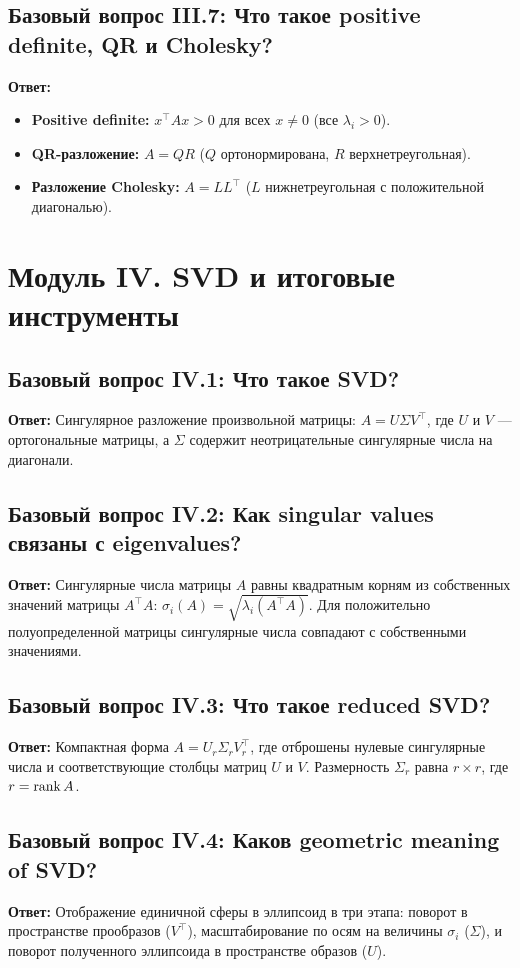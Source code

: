\subsection{Базовый вопрос III.7: Что такое positive definite, QR и Cholesky?}
\textbf{Ответ:}
\begin{itemize}
    \item \textbf{Positive definite:} $x^\top A x > 0$ для всех $x \ne 0$ (все $\lambda_i > 0$).
    \item \textbf{QR-разложение:} $A = QR$ ($Q$ ортонормирована, $R$ верхнетреугольная).
    \item \textbf{Разложение Cholesky:} $A = L L^\top$ ($L$ нижнетреугольная с положительной диагональю).
\end{itemize}

\newpage

\section{Модуль IV. SVD и итоговые инструменты}

\subsection{Базовый вопрос IV.1: Что такое SVD?}
\textbf{Ответ:} Сингулярное разложение произвольной матрицы: $A = U \Sigma V^\top$, где $U$ и $V$ — ортогональные
матрицы, а $\Sigma$ содержит неотрицательные сингулярные числа на диагонали.

\subsection{Базовый вопрос IV.2: Как singular values связаны с eigenvalues?}
\textbf{Ответ:} Сингулярные числа матрицы $A$ равны квадратным корням из собственных значений матрицы $A^\top A$:
$\sigma_i(A) = \sqrt{\lambda_i(A^\top A)}$.
Для положительно полуопределенной матрицы сингулярные числа совпадают с собственными значениями.

\subsection{Базовый вопрос IV.3: Что такое reduced SVD?}
\textbf{Ответ:} Компактная форма $A = U_r \Sigma_r V_r^\top$, где отброшены нулевые сингулярные числа и соответствующие
столбцы матриц $U$ и $V$.
Размерность $\Sigma_r$ равна $r \times r$, где $r = \operatorname{rank} A$.

\subsection{Базовый вопрос IV.4: Каков geometric meaning of SVD?}
\textbf{Ответ:} Отображение единичной сферы в эллипсоид в три этапа: поворот в пространстве прообразов ($V^\top$),
масштабирование по осям на величины $\sigma_i$ ($\Sigma$), и поворот полученного эллипсоида в пространстве образов
($U$).

